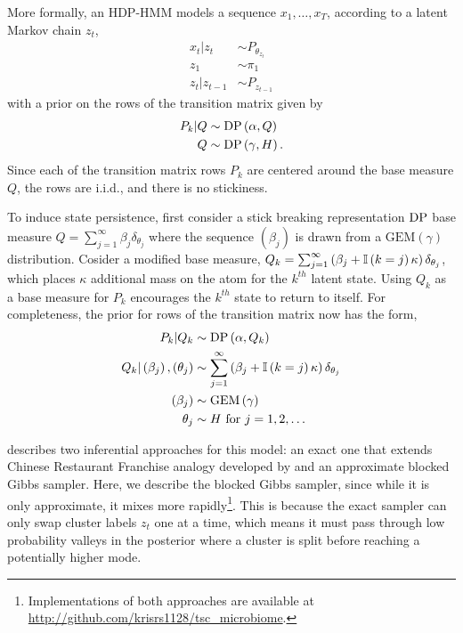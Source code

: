 \documentclass[14pt]{extreport}
\begin{document}
More formally, an HDP-HMM models a sequence $x_{1}, \dots, x_{T}$, according to
a latent Markov chain $z_t$,
\begin{align*}
  x_t \vert z_t &\sim P_{\theta_{z_t}} \\
    z_1 &\sim \pi_1 \\
    z_t \vert z_{t - 1} &\sim P_{z_{t - 1}}
\end{align*}
with a prior on the rows of the transition matrix given by
\begin{align*}
  P_k \vert Q &\sim \textnormal{DP}\left(\alpha, Q\right) \\
  Q &\sim \textnormal{DP}\left(\gamma, H\right).
\end{align*}
Since each of the transition matrix rows $P_k$ are centered around the base
measure $Q$, the rows are i.i.d., and there is no stickiness.

To induce state persistence, first consider a stick breaking representation
$\textnormal{DP}$ base measure $Q = \sum_{j = 1}^{\infty} \beta_j \delta_{\theta_j}$ where
the sequence $\left(\beta_j\right)$ is drawn from a
$\text{GEM}\left(\gamma\right)$ distribution. Cosider a modified base measure,
$Q_k = \sum_{j = 1}^{\infty} \left(\beta_j + \mathbb{I}\left({k =
    j}\right)\kappa\right)\delta_{\theta_j}$, which places $\kappa$ additional mass on
  the atom for the $k^{th}$ latent state. Using $Q_k$ as a base measure for
  $P_k$ encourages the $k^{th}$ state to return to itself. For completeness, the
  prior for rows of the transition matrix now has the form,
\begin{align*}
  P_k \vert Q_k &\sim \textnormal{DP}\left(\alpha, Q_k\right) \\
  Q_k \vert \left(\beta_j\right), \left(\theta_j\right) &\sim \sum_{j = 1}^{\infty} \left(\beta_j + \mathbb{I}\left({k = j}\right)\kappa\right)\delta_{\theta_j} \\
  \left(\beta_j\right) &\sim \text{GEM}\left(\gamma\right) \\
  \theta_j &\sim H \text{ for }j = 1, 2, \dots
\end{align*}

\citep{fox2009bayesian} describes two inferential approaches for this model: an
exact one that extends Chinese Restaurant Franchise analogy developed by
\citep{teh2006hierarchical} and an approximate blocked Gibbs sampler. Here, we
describe the blocked Gibbs sampler, since while it is only approximate, it mixes
more rapidly\footnote{Implementations of both approaches are available at
  \url{http://github.com/krisrs1128/tsc\_microbiome}.}. This is because the exact
  sampler can only swap cluster labels $z_t$ one at a time, which means it must
  pass through low probability valleys in the posterior where a cluster is split
  before reaching a potentially higher mode.
\end{document}
